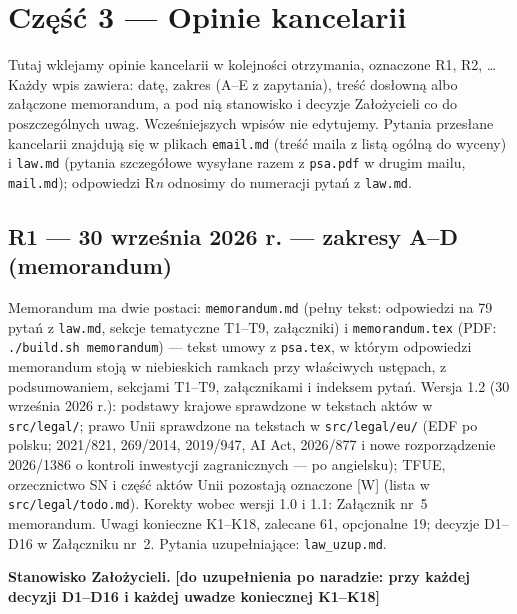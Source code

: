 \documentclass[12pt,a4paper]{report}
\newcommand{\field}[1]{\textbf{[#1]}}
\begin{document}
\clearpage
\section*{Część 3 — Opinie kancelarii}

Tutaj wklejamy opinie kancelarii w kolejności otrzymania, oznaczone R1, R2, \ldots{} Każdy wpis zawiera: datę, zakres (A--E z zapytania), treść dosłowną albo załączone memorandum, a pod nią stanowisko i decyzje Założycieli co do poszczególnych uwag. Wcześniejszych wpisów nie edytujemy. Pytania przesłane kancelarii znajdują się w plikach \texttt{email.md} (treść maila z listą ogólną do wyceny) i \texttt{law.md} (pytania szczegółowe wysyłane razem z \texttt{psa.pdf} w drugim mailu, \texttt{mail.md}); odpowiedzi R\emph{n} odnosimy do numeracji pytań z \texttt{law.md}.

\subsection*{R1 --- 30 września 2026 r. --- zakresy A--D (memorandum)}
Memorandum ma dwie postaci: \texttt{memorandum.md} (pełny tekst: odpowiedzi na 79 pytań z \texttt{law.md}, sekcje tematyczne T1--T9, załączniki) i \texttt{memorandum.tex} (PDF: \texttt{./build.sh memorandum}) --- tekst umowy z \texttt{psa.tex}, w którym odpowiedzi memorandum stoją w niebieskich ramkach przy właściwych ustępach, z podsumowaniem, sekcjami T1--T9, załącznikami i indeksem pytań. Wersja 1.2 (30 września 2026 r.): podstawy krajowe sprawdzone w tekstach aktów w \texttt{src/legal/}; prawo Unii sprawdzone na tekstach w \texttt{src/legal/eu/} (EDF po polsku; 2021/821, 269/2014, 2019/947, AI Act, 2026/877 i nowe rozporządzenie 2026/1386 o kontroli inwestycji zagranicznych --- po angielsku); TFUE, orzecznictwo SN i część aktów Unii pozostają oznaczone [W] (lista w \texttt{src/legal/todo.md}). Korekty wobec wersji 1.0 i 1.1: Załącznik nr~5 memorandum. Uwagi konieczne K1--K18, zalecane 61, opcjonalne 19; decyzje D1--D16 w Załączniku nr~2. Pytania uzupełniające: \texttt{law\_uzup.md}.

\textbf{Stanowisko Założycieli.} \field{do uzupełnienia po naradzie: przy każdej decyzji D1--D16 i każdej uwadze koniecznej K1--K18}
\end{document}
